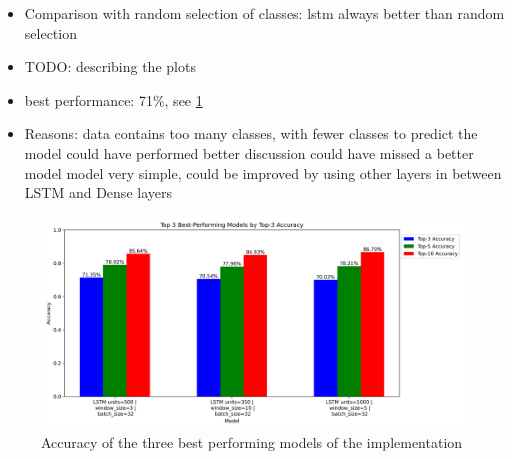 \begin{itemize}
    \item Comparison with random selection of classes: lstm always better than random selection
    \item TODO: describing the plots
    \item best performance: 71\%, see \cref{fig:top3_best_models}
    \item Reasons:
    \subitem data contains too many classes, with fewer classes to predict the model could have performed better
    \subitem discussion could have missed a better model
    \subitem model very simple, could be improved by using other layers in between LSTM and Dense layers
\end{itemize}

\begin{figure}[h!]
    \centering
    \includegraphics[scale=0.4]{images/top3_best_models.png}
    \caption{Accuracy of the three best performing models of the implementation}
    \label{fig:top3_best_models}
\end{figure}

